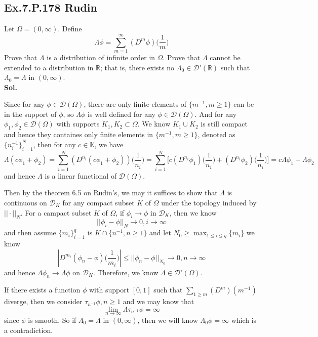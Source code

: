 \documentclass[lang=en,11pt,a4paper,citestyle =authoryear]{elegantpaper}
\newcommand{\R}{\mathbb{R}}
\begin{document}
\subsection*{Ex.7.P.178 Rudin} 
Let $\Omega = (0,\infty)$. Define
\[\Lambda \phi = \sum\limits_{m=1}^{\infty}(D^m\phi)\Big(\dfrac{1}{m}\Big)\]
Prove that $\Lambda$ is a distribution of infinite order in $\Omega$. Prove that $\Lambda$ cannot be extended to a distribution in $\R$; that is, there exists no $\Lambda_0 \in \mathscr{D}'(\R)$ such that $\Lambda_0 = \Lambda$ in $(0,\infty)$.
\vspace{0.5em}\\
\textbf{Sol.} \par
Since for any $\phi\in\mathscr{D}(\Omega)$, there are only finite elements of $\{m^{-1},m\geq 1\}$ can be in the support of $\phi$, so $\Lambda \phi$ is well defined for any $\phi \in \mathscr{D}(\Omega)$. And for any $\phi_1,\phi_2\in\mathscr{D}(\Omega)$ with supports $K_1,K_2\subset\Omega$. We know $K_1\cup K_2$ is still compact and hence they containes only finite elements in $\{m^{-1},m\geq 1\}$, denoted as $\{n_i^{-1}\}_{i=1}^N$, then for any $c\in\mathbb{K}$, we have
\[
\Lambda (c\phi_1+\phi_2) = \sum\limits_{i=1}^N (D^{n_i}(c\phi_1+\phi_2))\Big(\dfrac{1}{n_i}\Big) = \sum\limits_{i=1}^N \Big[c(D^{n_i}\phi_1)\Big(\dfrac{1}{n_i}\Big)+(D^{n_i}\phi_2)\Big(\dfrac{1}{n_i}\Big)\Big] = c\Lambda \phi_1 + \Lambda \phi_2
\]
and hence $\Lambda$ is a linear functional of $\mathscr{D}(\Omega)$.\par
Then by the theorem 6.5 on Rudin's, we may it suffices to show that $\Lambda$ is continuous on $\mathscr{D}_K$ for any compact subset $K$ of $\Omega$ under the topology induced by $||\cdot||_N$. For a campact subset $K$ of $\Omega$, if $\phi_i \to \phi$ in $\mathscr{D}_K$, then we know
\[
||\phi_i - \phi||_N \to 0, i\to\infty
\]
and then assume $\{m_i\}_{i=1}^q$ is $K\cap\{n^{-1},n\geq 1\}$ and let $N_0 \geq \max_{1\leq i \leq q}\{m_i\}$ we know
\[
|D^{m_i}(\phi_n-\phi)\Big(\dfrac{1}{m_i}\Big)| \leq ||\phi_n-\phi||_{N_0} \to 0, n\to\infty
\]
and hence $\Lambda \phi_n \to \Lambda \phi$ on $\mathscr{D}_K$. Therefore, we know $\Lambda \in \mathscr{D}'(\Omega)$.\par
If there exists a function $\phi$ with support $[0,1]$ such that $\sum\limits_{1\geq m}(D^m)(m^{-1})$ diverge, then we consider $\tau_{n^{-1}}\phi, n\geq 1$ and we may know that
\[
\lim_{n\to \infty} \Lambda \tau_{n^{-1}}\phi = \infty
\]
since $\phi$ is smooth. So if $\Lambda_0 = \Lambda$ in $(0,\infty)$, then we will know $\Lambda_0 \phi = \infty$ which is a contradiction.\par
\end{document}
